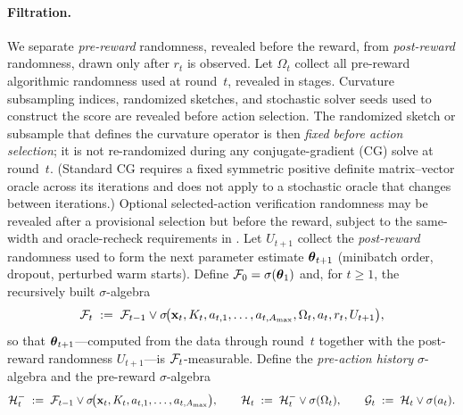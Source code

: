 \paragraph{Filtration.}
We separate \emph{pre-reward} randomness, revealed before the reward, from
\emph{post-reward} randomness, drawn only after $r_t$ is observed.  Let
$\Omega_t$ collect all pre-reward algorithmic randomness used at round~$t$,
revealed in stages.  Curvature subsampling indices, randomized sketches, and
stochastic solver seeds used to construct the score are revealed before action
selection.  The randomized sketch or subsample that defines the curvature
operator is then \emph{fixed before action selection}; it is not re-randomized
during any conjugate-gradient (CG) solve at round~$t$.  (Standard CG requires a
fixed symmetric positive definite matrix--vector oracle across its iterations and
does not apply to a stochastic oracle that changes between iterations.)  Optional
selected-action verification randomness may be revealed after a provisional
selection but before the reward, subject to the same-width and oracle-recheck
requirements in .
Let $U_{t+1}$ collect the \emph{post-reward} randomness used to form the next
parameter estimate $\boldsymbol{\theta}_{t+1}$ (minibatch order, dropout, perturbed warm
starts).
Define $\mathcal{F}_0 = \sigma(\boldsymbol{\theta}_1)$ and, for $t\ge 1$, the recursively built
$\sigma$-algebra
\begin{equation}\label{eq:filtration-F}
  \mathcal{F}_t \;:=\;
  \mathcal{F}_{t-1}\vee
  \sigma\!\bigl(\mathbf{x}_t,K_t,a_{t,1},\ldots,a_{t,A_{\max}},
                  \Omega_t,a_t,r_t,U_{t+1}\bigr),
\end{equation}
so that $\boldsymbol{\theta}_{t+1}$---computed from the data through round~$t$ together with
the post-reward randomness $U_{t+1}$---is $\mathcal{F}_t$-measurable.
Define the \emph{pre-action history} $\sigma$-algebra and the pre-reward
$\sigma$-algebra
\begin{equation}\label{eq:filtration}
  \mathcal{H}_t^-\;:=\;\mathcal{F}_{t-1}\vee
  \sigma\!\bigl(\mathbf{x}_t,K_t,a_{t,1},\ldots,a_{t,A_{\max}}\bigr),
  \qquad
  \mathcal{H}_t\;:=\;\mathcal{H}_t^-\vee\sigma(\Omega_t),
  \qquad
  \mathcal{G}_t \;:=\; \mathcal{H}_t\vee\sigma(a_t).
\end{equation}
